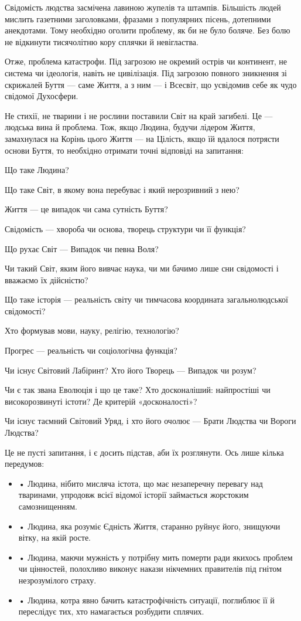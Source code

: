 Свідомість людства засмічена лавиною жупелів та штампів. Більшість людей
мислить газетними заголовками, фразами з популярних пісень, дотепними
анекдотами. Тому необхідно оголити проблему, як би не було боляче. Без болю не
відкинути тисячолітню кору сплячки й невігластва.

Отже, проблема катастрофи. Під загрозою не окремий острів чи континент, не
система чи ідеологія, навіть не цивілізація. Під загрозою повного зникнення зі
скрижалей Буття — саме Життя, а з ним — і Всесвіт, що усвідомив себе як чудо
свідомої Духосфери.

Не стихії, не тварини і не рослини поставили Світ на край загибелі. Це —
людська вина й проблема. Тож, якщо Людина, будучи лідером Життя, замахнулася на
Корінь цього Життя — на Цілість, якщо їй вдалося потрясти основи Буття, то
необхідно отримати точні відповіді на запитання:

Що таке Людина?

Що таке Світ, в якому вона перебуває і який нерозривний з нею?

Життя — це випадок чи сама сутність Буття?

Свідомість — хвороба чи основа, творець структури чи її функція?

Що рухає Світ — Випадок чи певна Воля?

Чи такий Світ, яким його вивчає наука, чи ми бачимо лише сни свідомості і
вважаємо їх дійсністю?

Що таке історія — реальність світу чи тимчасова координата загальнолюдської
свідомості?

Хто формував мови, науку, релігію, технологію?

Прогрес — реальність чи соціологічна функція?

Чи існує Світовий Лабіринт? Хто його Творець — Випадок чи розум?

Чи є так звана Еволюція і що це таке? Хто досконаліший: найпростіші чи
високорозвинуті істоти? Де критерій «досконалості»?

Чи існує таємний Світовий Уряд, і хто його очолює — Брати Людства чи Вороги
Людства?

Це не пусті запитання, і є досить підстав, аби їх розглянути. Ось лише кілька
передумов:

\begin{itemize}
	

\item • Людина, нібито мисляча істота, що має незаперечну перевагу над тваринами,
упродовж всієї відомої історії займається жорстоким самознищенням.

\item • Людина, яка розуміє Єдність Життя, старанно руйнує його, знищуючи вітку, на
якій росте.

\item • Людина, маючи мужність у потрібну мить померти ради якихось проблем чи
				цінностей, полохливо виконує накази нікчемних правителів під гнітом
								незрозумілого страху.

\item • Людина, котра явно бачить катастрофічність ситуації, поглиблює її й
				переслідує тих, хто намагається розбудити сплячих.

\end{itemize}

